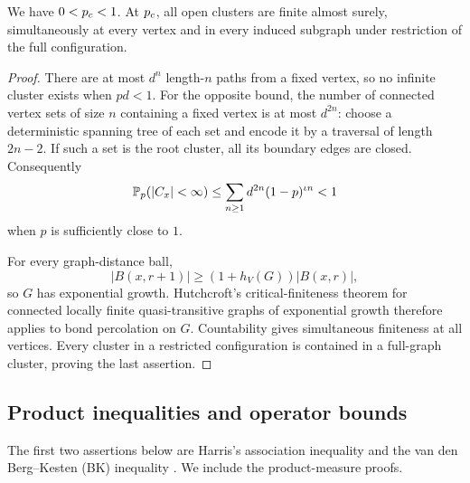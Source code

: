 \begin{lemma}\label{pre:critical-finiteness}
We have $0<{p_c}<1$. At ${p_c}$, all open clusters are finite almost surely,
simultaneously at every vertex and in every induced subgraph under
restriction of the full configuration.
\end{lemma}
\begin{proof}
There are at most $d^n$ length-$n$ paths from a fixed vertex, so no
infinite cluster exists when $pd<1$. For the opposite bound, the number
of connected vertex sets of size $n$ containing a fixed vertex is at
most $d^{2n}$: choose a deterministic spanning tree of each set and
encode it by a traversal of length $2n-2$. If such a set is the root
cluster, all its boundary edges are closed. Consequently
\[
 \mathbb P_p(|C_x|<\infty)
 \le \sum_{n\ge1}d^{2n}(1-p)^{\iota n}<1
\]
when $p$ is sufficiently close to $1$.

For every graph-distance ball,
\[
 |B(x,r+1)|\ge(1+h_V(G))|B(x,r)|,
\]
so $G$ has exponential growth. Hutchcroft's critical-finiteness theorem
for connected locally finite quasi-transitive graphs of exponential
growth \cite[Theorem~1.2]{Hutchcroft2016} therefore applies to bond
percolation on $G$. Countability gives simultaneous finiteness at all
vertices. Every cluster in a restricted configuration is contained in
a full-graph cluster, proving the last assertion.
\end{proof}

\subsection{Product inequalities and operator bounds}
\label{pre:product-tools}

The first two assertions below are Harris's association inequality
\cite{Harris1960} and the van den Berg--Kesten (BK) inequality
\cite{VanDenBergKesten1985}. We include the product-measure proofs.

